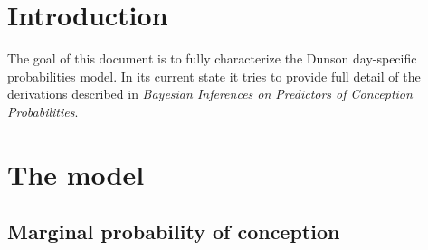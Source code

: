 \documentclass[11pt]{article}
\begin{document}
\setcounter{section}{-1}
\section{Introduction}
The goal of this document is to fully characterize the Dunson day-specific probabilities model.  In its current state it tries to provide full detail of the derivations described in \textit{Bayesian Inferences on Predictors of Conception Probabilities}.




\section{The model}




\subsection{Marginal probability of conception}
\end{document}
